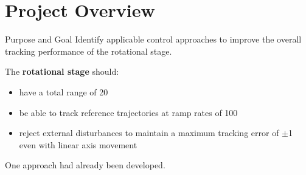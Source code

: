 \documentclass[10pt]{beamer}
\begin{document}
\section{Project Overview}

\begin{frame}[fragile]{Purpose and Goal}
  Identify applicable control approaches to improve the overall tracking performance of the rotational stage. \newline

  The \textbf{rotational stage} should:
  \begin{itemize}
    \item have a total range of \unit{20}{\milli\rad}
    \item be able to track reference trajectories at ramp rates of \unit{100}{\micro\radianpersecond}
    \item reject external disturbances to maintain a maximum tracking error of $\pm$\unit{1}{\micro\rad} even with linear axis movement
  \end{itemize}

  One approach had already been developed.

\end{frame}
\end{document}
